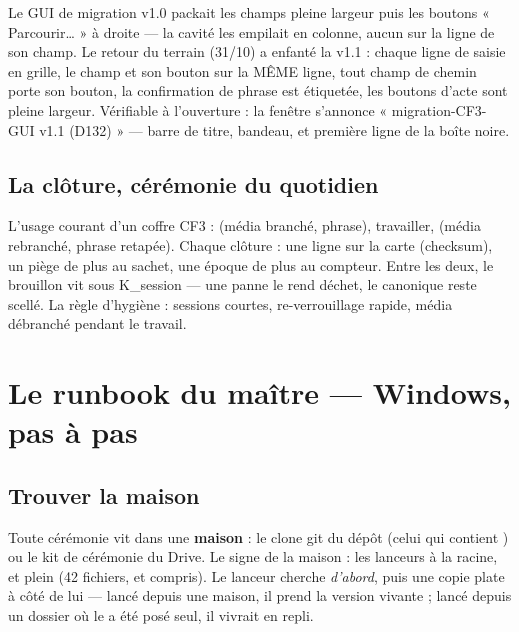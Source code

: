 \begin{terrain}
Le GUI de migration v1.0 packait les champs pleine largeur puis les boutons
« Parcourir\ldots{} » à droite — la cavité les empilait en colonne, aucun sur la
ligne de son champ. Le retour du terrain (31/10) a enfanté la v1.1 : chaque ligne
de saisie en grille, le champ et son bouton sur la MÊME ligne, tout champ de chemin
porte son bouton, la confirmation de phrase est étiquetée, les boutons d'acte sont
pleine largeur. Vérifiable à l'ouverture : la fenêtre s'annonce
« migration-CF3-GUI v1.1 (D132) » — barre de titre, bandeau, et première ligne de la
boîte noire.
\end{terrain}

\subsection{La clôture, cérémonie du quotidien}\label{sec:cloture}

L'usage courant d'un coffre CF3 :  (média branché, phrase), travailler,
 (média rebranché, phrase retapée). Chaque clôture : une ligne sur la
carte (checksum), un piège de plus au sachet, une époque de plus au compteur. Entre
les deux, le brouillon vit sous K\_session — une panne le rend déchet, le canonique
reste scellé. La règle d'hygiène : sessions courtes, re-verrouillage rapide, média
débranché pendant le travail.

\section{Le runbook du maître — Windows, pas à pas}\label{sec:runbook}

\subsection{Trouver la maison}\label{sec:maison}

Toute cérémonie vit dans une \textbf{maison} : le clone git du dépôt (celui qui
contient ) ou le kit de cérémonie du Drive. Le signe de la
maison : les lanceurs  à la racine, et  plein
(42 fichiers,  et  compris). Le
lanceur cherche  \emph{d'abord}, puis
une copie plate à côté de lui — lancé depuis une maison, il prend la version vivante ;
lancé depuis un dossier où le  a été posé seul, il vivrait en repli.

